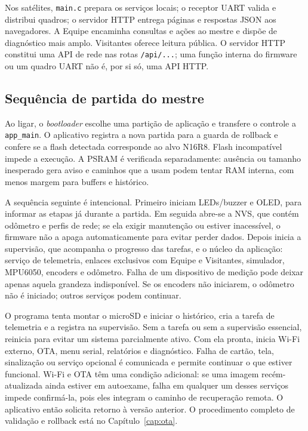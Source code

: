 Nos satélites, \texttt{main.c} prepara os serviços locais; o receptor UART valida e distribui quadros; o servidor HTTP entrega páginas e respostas JSON aos navegadores. A Equipe encaminha consultas e ações ao mestre e dispõe de diagnóstico mais amplo. Visitantes oferece leitura pública. O servidor HTTP constitui uma API de rede nas rotas \texttt{/api/...}; uma função interna do firmware ou um quadro UART não é, por si só, uma API HTTP.

\subsection{Sequência de partida do mestre}
Ao ligar, o \emph{bootloader} escolhe uma partição de aplicação e transfere o controle a \texttt{app\_main}. O aplicativo registra a nova partida para a guarda de rollback e confere se a flash detectada corresponde ao alvo N16R8. Flash incompatível impede a execução. A PSRAM é verificada separadamente: ausência ou tamanho inesperado gera aviso e caminhos que a usam podem tentar RAM interna, com menos margem para buffers e histórico.

A sequência seguinte é intencional. Primeiro iniciam LEDs/buzzer e OLED, para informar as etapas já durante a partida. Em seguida abre-se a NVS, que contém odômetro e perfis de rede; se ela exigir manutenção ou estiver inacessível, o firmware não a apaga automaticamente para evitar perder dados. Depois inicia a supervisão, que acompanha o progresso das tarefas, e o núcleo da aplicação: serviço de telemetria, enlaces exclusivos com Equipe e Visitantes, simulador, MPU6050, encoders e odômetro. Falha de um dispositivo de medição pode deixar apenas aquela grandeza indisponível. Se os encoders não iniciarem, o odômetro não é iniciado; outros serviços podem continuar.

O programa tenta montar o microSD e iniciar o histórico, cria a tarefa de telemetria e a registra na supervisão. Sem a tarefa ou sem a supervisão essencial, reinicia para evitar um sistema parcialmente ativo. Com ela pronta, inicia Wi-Fi externo, OTA, menu serial, relatórios e diagnóstico. Falha de cartão, tela, sinalização ou serviço opcional é comunicada e permite continuar o que estiver funcional. Wi-Fi e OTA têm uma condição adicional: se uma imagem recém-atualizada ainda estiver em autoexame, falha em qualquer um desses serviços impede confirmá-la, pois eles integram o caminho de recuperação remota. O aplicativo então solicita retorno à versão anterior. O procedimento completo de validação e rollback está no Capítulo~\ref{cap:ota}.

